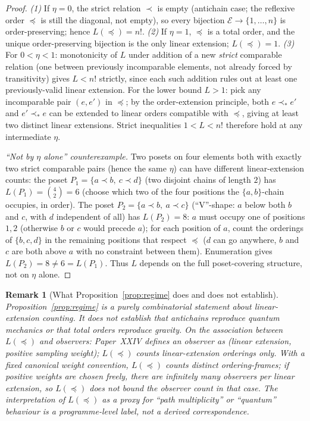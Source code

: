 \documentclass[12pt]{article}
\newtheorem{remark}[theorem]{Remark}
\newcommand{\Ecal}{\mathcal{E}}
\begin{document}
\begin{proof}
\emph{(1)} If $\eta = 0$, the strict relation $\prec$ is empty (antichain case; the reflexive order $\preceq$ is still the diagonal, not empty), so every bijection $\Ecal \to \{1, \dots, n\}$ is order-preserving; hence $L(\preceq) = n!$. \emph{(2)} If $\eta = 1$, $\preceq$ is a total order, and the unique order-preserving bijection is the only linear extension; $L(\preceq) = 1$. \emph{(3)} For $0 < \eta < 1$: monotonicity of $L$ under addition of a new \emph{strict} comparable relation (one between previously incomparable elements, not already forced by transitivity) gives $L < n!$ strictly, since each such addition rules out at least one previously-valid linear extension. For the lower bound $L > 1$: pick any incomparable pair $(e, e')$ in $\preceq$; by the order-extension principle, both $e \prec_{\!*} e'$ and $e' \prec_{\!*} e$ can be extended to linear orders compatible with $\preceq$, giving at least two distinct linear extensions. Strict inequalities $1 < L < n!$ therefore hold at any intermediate $\eta$.

\emph{``Not by $\eta$ alone'' counterexample.} Two posets on four elements both with exactly two strict comparable pairs (hence the same $\eta$) can have different linear-extension counts: the poset $P_1 = \{a \prec b,\ c \prec d\}$ (two disjoint chains of length $2$) has $L(P_1) = \binom{4}{2} = 6$ (choose which two of the four positions the $\{a, b\}$-chain occupies, in order). The poset $P_2 = \{a \prec b,\ a \prec c\}$ (``V''-shape: $a$ below both $b$ and $c$, with $d$ independent of all) has $L(P_2) = 8$: $a$ must occupy one of positions $1, 2$ (otherwise $b$ or $c$ would precede $a$); for each position of $a$, count the orderings of $\{b, c, d\}$ in the remaining positions that respect $\preceq$ ($d$ can go anywhere, $b$ and $c$ are both above $a$ with no constraint between them). Enumeration gives $L(P_2) = 8 \neq 6 = L(P_1)$. Thus $L$ depends on the full poset-covering structure, not on $\eta$ alone.
\end{proof}

\begin{remark}[What Proposition~\ref{prop:regime} does and does not establish]
Proposition~\ref{prop:regime} is a purely combinatorial statement about linear-extension counting. It does \emph{not} establish that antichains reproduce quantum mechanics or that total orders reproduce gravity. On the association between $L(\preceq)$ and observers: Paper~XXIV defines an observer as (linear extension, positive sampling weight); $L(\preceq)$ counts linear-extension orderings only. With a fixed canonical weight convention, $L(\preceq)$ counts distinct ordering-frames; if positive weights are chosen freely, there are infinitely many observers per linear extension, so $L(\preceq)$ does \emph{not} bound the observer count in that case. The interpretation of $L(\preceq)$ as a proxy for ``path multiplicity'' or ``quantum'' behaviour is a programme-level label, not a derived correspondence.
\end{remark}
\end{document}
